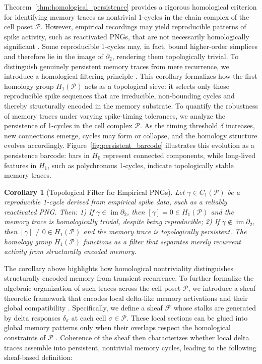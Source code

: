 \documentclass[lettersize,journal]{IEEEtran}
\newtheorem{corollary}{Corollary}
\begin{document}
\noindent
Theorem~\ref{thm:homological_persistence} provides a rigorous homological criterion for identifying memory traces as nontrivial 1-cycles in the chain complex of the cell poset \( \mathcal{P} \). However, empirical recordings may yield reproducible patterns of spike activity, such as reactivated PNGs, that are not necessarily homologically significant \cite{reimann2017cliques}. Some reproducible 1-cycles may, in fact, bound higher-order simplices and therefore lie in the image of \( \partial_2 \), rendering them topologically trivial.
To distinguish genuinely persistent memory traces from mere recurrence, we introduce a homological filtering principle \cite{ghrist2008barcodes}. This corollary formalizes how the first homology group \( H_1(\mathcal{P}) \) acts as a topological sieve: it selects only those reproducible spike sequences that are irreducible, non-bounding cycles and thereby structurally encoded in the memory substrate.
To quantify the robustness of memory traces under varying spike-timing tolerances, we analyze the persistence of 1-cycles in the cell complex \( \mathcal{P} \). As the timing threshold \( \delta \) increases, new connections emerge, cycles may form or collapse, and the homology structure evolves accordingly. Figure~\ref{fig:persistent_barcode} illustrates this evolution as a persistence barcode: bars in \( H_0 \) represent connected components, while long-lived features in \( H_1 \), such as polychronous 1-cycles, indicate topologically stable memory traces.



\begin{corollary}[Topological Filter for Empirical PNGs]
Let \( \gamma \in C_1(\mathcal{P}) \) be a \emph{reproducible} 1-cycle derived from empirical spike data, such as a reliably reactivated PNG. Then:
1) If \( \gamma \in \operatorname{im} \partial_2 \), then \( [\gamma] = 0 \in H_1(\mathcal{P}) \) and the memory trace is homologically trivial, despite being reproducible;
2) If \( \gamma \notin \operatorname{im} \partial_2 \), then \( [\gamma] \neq 0 \in H_1(\mathcal{P}) \) and the memory trace is topologically persistent.
The homology group \( H_1(\mathcal{P}) \) functions as a filter that separates merely recurrent activity from structurally encoded memory.
\label{cor:homological_filter}
\end{corollary}

The corollary above highlights how homological nontriviality distinguishes structurally encoded memory from transient recurrence. To further formalize the algebraic organization of such traces across the cell poset \( \mathcal{P} \), we introduce a sheaf-theoretic framework that encodes local delta-like memory activations and their global compatibility \cite{ayzenberg2025sheaf}. Specifically, we define a sheaf \( \mathcal{F} \) whose stalks are generated by delta responses \( \delta_\sigma \) at each cell \( \sigma \in \mathcal{P} \). These local sections can be glued into global memory patterns only when their overlaps respect the homological constraints of \( \mathcal{P} \) \cite{sizemore2019importance}. Coherence of the sheaf then characterizes whether local delta traces assemble into persistent, nontrivial memory cycles, leading to the following sheaf-based definition:
\end{document}
